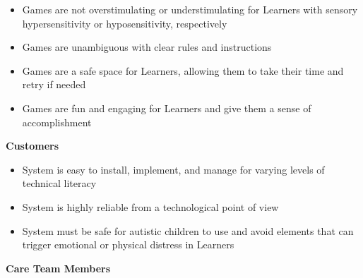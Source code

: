 \documentclass[12pt]{article}
\newcounter{srnumL} %
\newcounter{srnumCU} %
\newcounter{srnumC} %
\begin{document}
\noindent \begin{itemize}
  
  \setcounter{srnumL}{0}
  \item[\refstepcounter{srnumL}\thesrnumL \label{SR-LRN-1}:] Games are not overstimulating or understimulating for Learners with sensory hypersensitivity or hyposensitivity, respectively \citep{forbrainAutismLearning}

  \item[\refstepcounter{srnumL}\thesrnumL \label{SR-LRN-2}:] Games are unambiguous with clear rules and instructions \citep{fratnowAutismGaming}

  \item[\refstepcounter{srnumL}\thesrnumL \label{SR-LRN-3}:] Games are a safe space for Learners, allowing them to take their time and retry if needed \citep{fratnowAutismGaming}

  \item[\refstepcounter{srnumL}\thesrnumL \label{SR-LRN-4}:] Games are fun and engaging for Learners and give them a sense of accomplishment

\end{itemize}

\noindent \textbf{Customers}

\noindent \begin{itemize}

  \setcounter{srnumCU}{0}
  \item[\refstepcounter{srnumCU}\thesrnumCU \label{SR-CUST-1}:] System is easy to install, implement, and manage for varying levels of technical literacy

  \item[\refstepcounter{srnumCU}\thesrnumCU \label{SR-CUST-2}:] System is highly reliable from a technological point of view

  \item[\refstepcounter{srnumCU}\thesrnumCU \label{SR-CUST-3}:] System must be safe for autistic children to use and avoid elements that can trigger emotional or physical distress in Learners
\end{itemize}

\noindent \textbf{Care Team Members}
\end{document}
